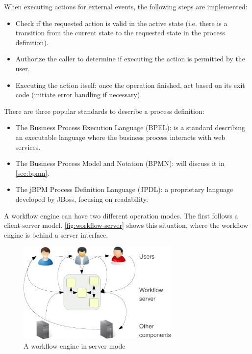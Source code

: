 When executing actions for external events, the following steps are implemented:

\begin{itemize}
\item Check if the requested action is valid in the active state (i.e. there is a transition from the current state to the requested state in the process definition).
\item Authorize the caller to determine if executing the action is permitted by the user.
\item Executing the action itself: once the operation finished, act based on its exit code (initiate error handling if necessary).
\end{itemize}

There are three popular standards to describe a process definition:

\begin{itemize}
\item The Business Process Execution Language (BPEL): is a standard describing an
executable language where the business process interacts with web services.
\item The Business Process Model and Notation (BPMN): will discuss it in \autoref{sec:bpmn}.
\item The jBPM Process Definition Language (JPDL): a proprietary language developed
by JBoss, focusing on readability.
\end{itemize}


A workflow engine can have two different operation modes. The first follows a
client-server model. \autoref{fig:workflow-server} shows this situation,
where the workflow engine is behind a server interface.

\begin{figure}[H]
\centering
\includegraphics[width=300px,keepaspectratio]{workflow-server.pdf}
\caption{A workflow engine in server mode}
\label{fig:workflow-server}
\end{figure}

